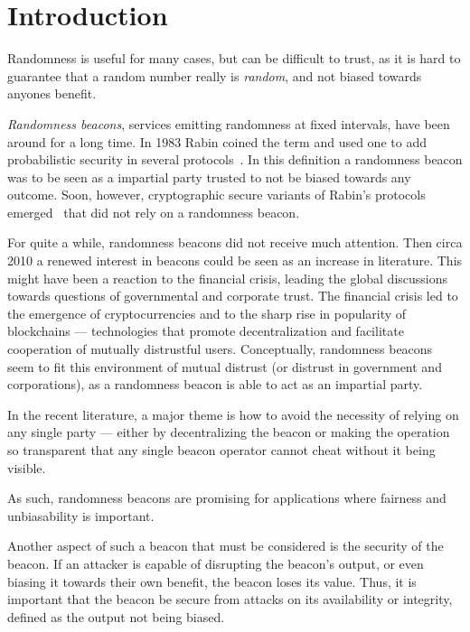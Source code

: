 \section{Introduction}

Randomness is useful for many cases, but can be difficult to trust, as it is hard to guarantee that a random number really is \emph{random}, and not biased towards anyones benefit. 

\emph{Randomness beacons}, services emitting randomness at fixed intervals, have been around for a long time.
In 1983 Rabin coined the term and used one to add probabilistic security in several protocols~\cite{rabin1983transaction}.
In this definition a randomness beacon was to be seen as a impartial party trusted to not be biased towards any outcome.
Soon, however, cryptographic secure variants of Rabin's protocols emerged~ that did not rely on a randomness beacon.

For quite a while, randomness beacons did not receive much attention. Then circa 2010 a renewed interest in beacons could be seen as an increase in literature.
This might have been a reaction to the financial crisis, leading the global discussions towards questions of governmental and corporate trust.
The financial crisis led to the emergence of cryptocurrencies and to the sharp rise in popularity of blockchains --- technologies that promote decentralization and facilitate cooperation of mutually distrustful users.
Conceptually, randomness beacons seem to fit this environment of mutual distrust (or distrust in government and corporations), as a randomness beacon is able to act as an impartial party.

In the recent literature, a major theme is how to avoid the necessity of relying on any single party --- either by decentralizing the beacon or making the operation so transparent that any single beacon operator cannot cheat without it being visible.

As such, randomness beacons are promising for applications where fairness and unbiasability is important.

Another aspect of such a beacon that must be considered is the security of the beacon. If an attacker is capable of disrupting the beacon's output, or even biasing it towards their own benefit, the beacon loses its value. Thus, it is important that the beacon be secure from attacks on its availability or integrity, defined as the output not being biased.


